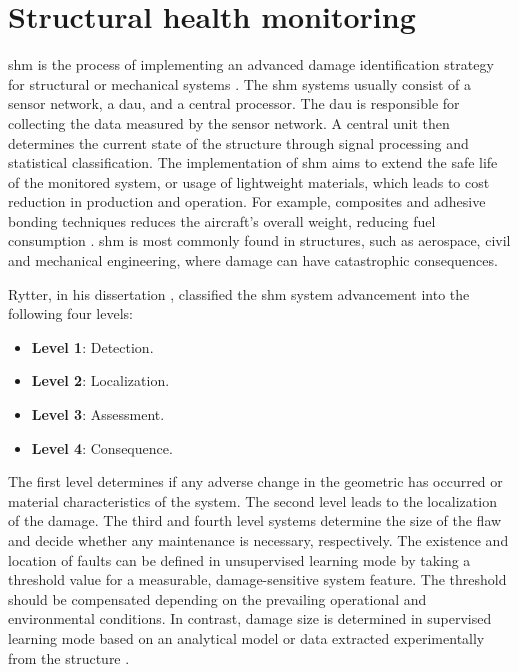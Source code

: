 \section{Structural health monitoring}
\label{sec:scm}

\Ac{shm} is the process of implementing an advanced damage identification strategy for structural or mechanical systems \cite{farrar2007introduction}.
The \ac{shm} systems usually consist of a sensor network, a \ac{dau}, and a central processor.
The \ac{dau} is responsible for collecting the data measured by the sensor network.
A central unit then determines the current state of the structure through signal processing and statistical classification.
The implementation of \ac{shm} aims to extend the safe life of the monitored system, or usage of lightweight materials, which leads to cost reduction in production and operation.
For example, composites and adhesive bonding techniques reduces the aircraft's overall weight, reducing fuel consumption \cite{scelsi2011potential}.
\ac{shm} is most commonly found in structures, such as aerospace, civil and mechanical engineering, where damage can have catastrophic consequences.

Rytter, in his dissertation \cite{rytter1993vibrational}, classified the \ac{shm} system advancement into the following four levels:
\begin{itemize}
	\item[] \textbf{Level 1}: Detection.
	\item[] \textbf{Level 2}: Localization.
	\item[] \textbf{Level 3}: Assessment.
	\item[] \textbf{Level 4}: Consequence.
\end{itemize}
The first level determines if any adverse change in the geometric has occurred or material characteristics of the system. The second level leads to the localization of the damage.
The third and fourth level systems determine the size of the flaw and decide whether any maintenance is necessary, respectively.
The existence and location of faults can be defined in unsupervised learning mode by taking a threshold value for a measurable, damage-sensitive system feature. The threshold should be compensated depending on the prevailing operational and environmental conditions.
In contrast, damage size is determined in supervised learning mode based on an analytical model or data extracted experimentally from the structure \cite{worden2007fundamental}.